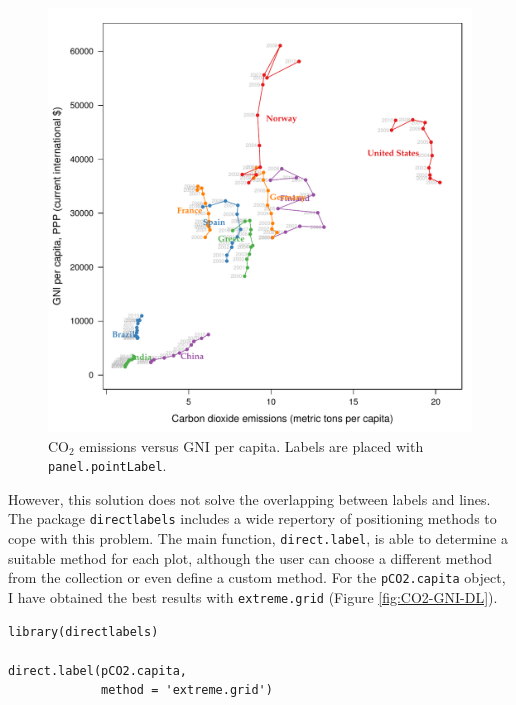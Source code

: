 \begin{figure}[htbp]
\centering
\includegraphics[width=.9\linewidth]{figs/CO2_capita.pdf}
\caption{\(\mathrm{CO_2}\) emissions versus GNI per capita. Labels are placed with \texttt{panel.pointLabel}. \label{fig:CO2-GNI-glayer}}
\end{figure}

However, this solution does not solve the overlapping between labels
and lines. The package \texttt{directlabels} \cite{Hocking2013} includes a
wide repertory of positioning methods to cope with this problem. The
main function, \texttt{direct.label}, is able to determine a suitable method
for each plot, although the user can choose a different method from
the collection or even define a custom method. For the \texttt{pCO2.capita}
object, I have obtained the best results with \texttt{extreme.grid} (Figure
\ref{fig:CO2-GNI-DL}).


\lstset{language=r,label= ,caption= ,captionpos=b,numbers=none}
\begin{lstlisting}
library(directlabels)

direct.label(pCO2.capita,
             method = 'extreme.grid')
\end{lstlisting}

